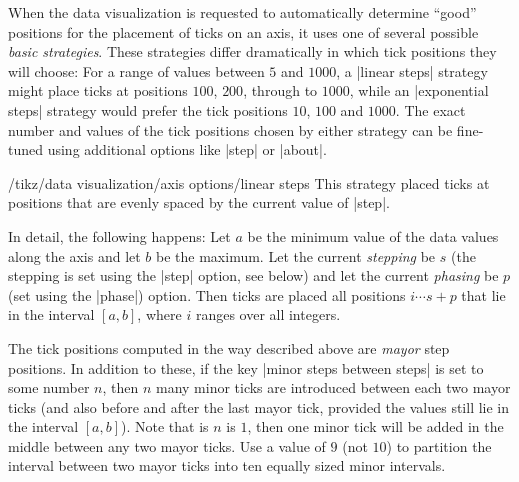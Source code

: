 When the data visualization is requested to automatically determine
``good'' positions for the placement of ticks on an axis, it uses one
of several possible \emph{basic strategies}. These strategies differ
dramatically in which tick positions they will choose: For a range of
values between $5$ and $1000$, a |linear steps| strategy might place
ticks at positions $100$, $200$, through to $1000$, while an
|exponential steps| strategy would prefer the tick positions $10$,
$100$ and $1000$. The exact number and values of the tick positions
chosen by either strategy can be fine-tuned using additional options
like |step| or |about|.

\begin{key}{/tikz/data visualization/axis options/linear steps}
  This strategy placed ticks at positions that are evenly spaced by
  the current value of |step|.

  In detail, the following happens: Let $a$ be the minimum value of the
  data values along the axis and let $b$ be the maximum. Let the
  current \emph{stepping} be $s$ (the stepping is set using the |step|
  option, see below) and let the current \emph{phasing} be $p$ (set
  using the |phase|) option. Then ticks are placed all positions
  $i\cdots s + p$ that lie in the interval $[a,b]$, where $i$ ranges
  over all integers.

  The tick positions computed in the way described above are
  \emph{mayor} step positions. In addition to these, if the key
  |minor steps between steps| is set to some number $n$, then $n$ many
  minor ticks are introduced between each two mayor ticks (and also
  before and after the last mayor tick, provided the values still lie
  in the interval $[a,b]$). Note that is $n$ is $1$, then one minor tick
  will be added in the middle between any two mayor ticks. Use a value
  of $9$ (not $10$) to partition the interval between two mayor ticks
  into ten equally sized minor intervals.

\begin{codeexample}[]
\end{codeexample}  
\end{key}

